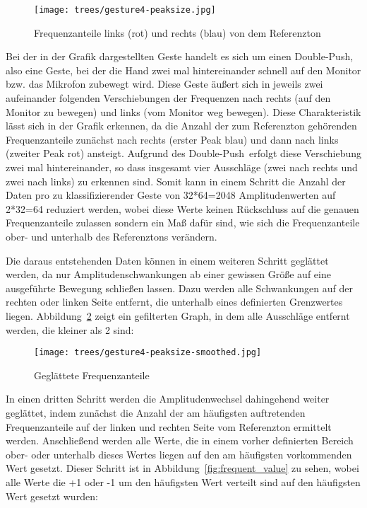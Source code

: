 \begin{figure}[htbp] \centering
\texttt{[image: trees/gesture4-peaksize.jpg]}
\caption{Frequenzanteile links (rot) und rechts (blau) von dem Referenzton}
\label{fig:sum_of_bins}
\end{figure}

Bei der in der Grafik dargestellten Geste handelt es sich um einen \glqq Double-Push\grqq , also eine Geste, bei der die Hand zwei mal 
hintereinander schnell auf den Monitor bzw. das Mikrofon zubewegt wird. Diese Geste äußert sich in jeweils zwei aufeinander folgenden 
Verschiebungen der Frequenzen nach rechts (auf den Monitor zu bewegen) und links (vom Monitor weg bewegen). 
Diese Charakteristik lässt sich in der Grafik erkennen, da die Anzahl der zum Referenzton gehörenden Frequenzanteile zunächst nach rechts (erster Peak blau) und dann nach links (zweiter Peak rot) ansteigt. Aufgrund des \glqq Double-Push\grqq\  erfolgt diese 
Verschiebung zwei mal hintereinander, so dass insgesamt vier Ausschläge (zwei nach rechts und zwei nach links) zu erkennen sind. 
Somit kann in einem Schritt die Anzahl der Daten pro zu klassifizierender Geste von 32*64=2048 Amplitudenwerten 
auf 2*32=64 reduziert werden, wobei diese Werte keinen Rückschluss auf die genauen Frequenzanteile zulassen sondern 
ein Maß dafür sind, wie sich die Frequenzanteile ober- und unterhalb des Referenztons verändern.

Die daraus entstehenden Daten können in einem weiteren Schritt geglättet werden, da nur Amplitudenschwankungen ab einer gewissen 
Größe auf eine ausgeführte Bewegung schließen lassen. Dazu werden alle Schwankungen auf der rechten oder linken Seite entfernt, 
die unterhalb eines definierten Grenzwertes liegen. 
Abbildung~\ref{fig:filtered} zeigt ein gefilterten Graph, in dem alle Ausschläge entfernt werden, die kleiner als 2 sind:

\begin{figure}[htbp] \centering
\texttt{[image: trees/gesture4-peaksize-smoothed.jpg]}
\caption{Geglättete Frequenzanteile}
\label{fig:filtered}
\end{figure}

In einen dritten Schritt werden die Amplitudenwechsel dahingehend weiter geglättet, indem zunächst die Anzahl der am häufigsten 
auftretenden Frequenzanteile auf der linken und rechten Seite vom Referenzton ermittelt werden. Anschließend werden alle Werte,
die in einem vorher definierten Bereich ober- oder unterhalb dieses Wertes liegen auf den am häufigsten vorkommenden Wert gesetzt.
Dieser Schritt ist in Abbildung~\ref{fig:frequent_value} zu sehen, wobei alle Werte die +1 oder -1 um den häufigsten Wert verteilt sind 
auf den häufigsten Wert gesetzt wurden:

